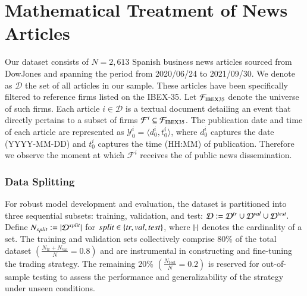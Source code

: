 \section{Mathematical Treatment of News Articles}

Our dataset consists of $N=2,613$ Spanish business news articles 
 sourced from DowJones and spanning the period from 2020/06/24 to 2021/09/30. 
 We denote as $\mathcal D$ the set of all articles in our sample.
 These articles have been specifically filtered to reference firms listed on the IBEX-35.
 Let $\mathcal{F}_{\text{IBEX35}}$ denote the universe of such firms. 
 Each article $i \in \mathcal{D}$ is a textual document detailing an event that directly pertains to a subset of firms $\mathcal{F}^i \subseteq \mathcal{F}_{\text{IBEX35}}$.
The publication date and time of each article are represented as $\mathcal{Y}_0^i = \langle d_0^i, t_0^i \rangle$, where $d_0^i$ captures the date 
(YYYY-MM-DD) 
and $t_0^i$ captures the time
 (HH:MM) 
 of publication. 
Therefore we observe the moment at which $\mathcal{F}^i$ receives the  of public news dissemination. 

\subsubsection*{Data Splitting}
For robust model development and evaluation, the dataset is partitioned into three sequential subsets: training, validation, and test:
$
\mathcal{D} := \mathcal{D}^{tr} \cup \mathcal{D}^{val} \cup \mathcal{D}^{test}.
$
Define $N_{split}:=|\mathcal{D}^{split}|$ for $split\in\left\{tr,val,test\right\}$, where $\left|\cdot\right|$ denotes the cardinality of a set. 
%
The training and validation sets collectively comprise 80\% of the total dataset $(\frac{N_{\text{tr}} + N_{\text{val}}}{N} = 0.8)$ and are instrumental in constructing and fine-tuning the trading strategy. The remaining 20\% $(\frac{N_{\text{test}}}{N} = 0.2)$ is reserved for out-of-sample testing to assess the performance and generalizability of the strategy under unseen conditions.

